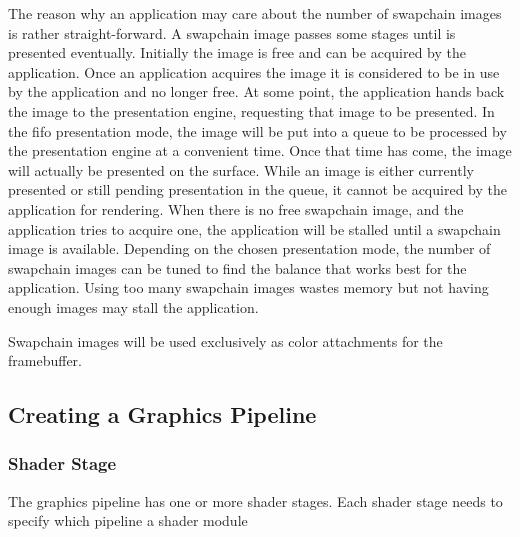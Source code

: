      The reason why an application may care about the number of swapchain images is rather straight-forward.
      A swapchain image passes some stages until is presented eventually.
      Initially the image is free and can be acquired by the application.
      Once an application acquires the image it is considered to be in use by the application and no longer free.
      At some point, the application hands back the image to the presentation engine, requesting that image to be presented.
      In the \gls{fifo} presentation mode, the image will be put into a queue to be processed by the presentation engine at a convenient time.
      Once that time has come, the image will actually be presented on the surface.
      While an image is either currently presented or still pending presentation in the queue, it cannot be acquired by the application for rendering.
      When there is no free swapchain image, and the application tries to acquire one, the application will be stalled until a swapchain image is available.
      Depending on the chosen presentation mode, the number of swapchain images can be tuned to find the balance that works best for the application.
      Using too many swapchain images wastes memory but not having enough images may stall the application.

      Swapchain images will be used exclusively as color attachments for the framebuffer.

    \subsection{Creating a Graphics Pipeline}
      \tbd

      \subsubsection{Shader Stage}
        \tbd
        The graphics pipeline has one or more shader stages.
        Each shader stage needs to specify which pipeline a shader module

